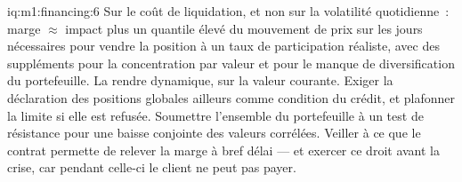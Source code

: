 \begin{solution}{iq:m1:financing:6}
Sur le coût de liquidation, et non sur la volatilité quotidienne~: marge $\approx$ impact plus un quantile élevé
du mouvement de prix sur les jours nécessaires pour vendre la position à un taux de participation réaliste,
avec des suppléments pour la concentration par valeur et pour le manque de diversification du portefeuille.
La rendre dynamique, sur la valeur courante. Exiger la déclaration des positions globales ailleurs
comme condition du crédit, et plafonner la limite si elle est refusée. Soumettre l'ensemble du portefeuille
à un test de résistance pour une baisse conjointe des valeurs corrélées. Veiller à ce que le contrat
permette de relever la marge à bref délai --- et exercer ce droit avant la crise,
car pendant celle-ci le client
ne peut pas payer.
\end{solution}
